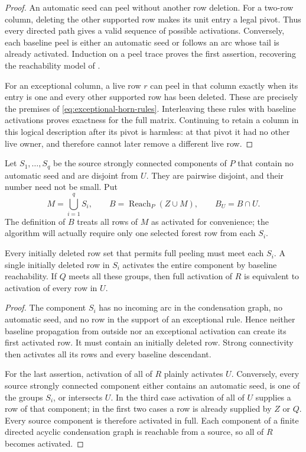 \begin{proof}
An automatic seed can peel without another row deletion.  For a two-row
column, deleting the other supported row makes its unit entry a legal
pivot.  Thus every directed path gives a valid sequence of possible
activations.  Conversely, each baseline peel is either an automatic seed
or follows an arc whose tail is already activated.  Induction on a peel
trace proves the first assertion, recovering the reachability model of
\cite{IncomingDualNormalization}.

For an exceptional column, a live row $r$ can peel in that column exactly
when its entry is one and every other supported row has been deleted.
These are precisely the premises of \eqref{eq:exceptional-horn-rules}.
Interleaving these rules with baseline activations proves exactness for
the full matrix.  Continuing to retain a column in this logical
description after its pivot is harmless: at that pivot it had no other
live owner, and therefore cannot later remove a different live row.
\end{proof}

Let $S_1,\ldots,S_q$ be the source strongly connected components of $P$
that contain no automatic seed and are disjoint from $U$.  They are
pairwise disjoint, and their number need not be small.  Put
\begin{equation}
       M=\bigcup_{i=1}^{q}S_i,\qquad
       B=\operatorname{Reach}_P(Z\cup M),\qquad B_U=B\cap U.
       \label{eq:exceptional-base}
\end{equation}
The definition of $B$ treats all rows of $M$ as activated for convenience;
the algorithm will actually require only one selected forest row from
each $S_i$.

\begin{lemma}
\label{lem:exceptional-obligations}
Every initially deleted row set that permits full peeling must meet each
$S_i$.  A single initially deleted row in $S_i$ activates the entire
component by baseline reachability.  If $Q$ meets all these groups, then
full activation of $R$ is equivalent to activation of every row in $U$.
\end{lemma}

\begin{proof}
The component $S_i$ has no incoming arc in the condensation graph, no
automatic seed, and no row in the support of an exceptional rule.  Hence
neither baseline propagation from outside nor an exceptional activation
can create its first activated row.  It must contain an initially deleted
row.  Strong connectivity then activates all its rows and every baseline
descendant.

For the last assertion, activation of all of $R$ plainly activates $U$.
Conversely, every source strongly connected component either contains an
automatic seed, is one of the groups $S_i$, or intersects $U$.  In the
third case activation of all of $U$ supplies a row of that component;
in the first two cases a row is already supplied by $Z$ or $Q$.
Every source component is therefore activated in full.  Each component
of a finite directed acyclic condensation graph is reachable from a
source, so all of $R$ becomes activated.
\end{proof}

